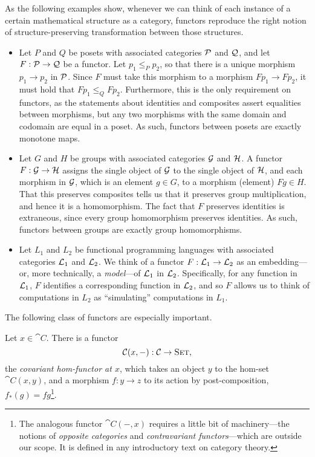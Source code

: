 \begin{ex}\label{ex:abstract-functors}
  As the following examples show, whenever we can think of each instance of a
  certain mathematical structure as a category, functors reproduce the right
  notion of structure-preserving transformation between those structures.
  \begin{itemize}
    \item Let $P$ and $Q$ be posets with associated categories $\mathcal{P}$ and $\mathcal{Q}$,
      and let $F: \mathcal{P}\to\mathcal{Q}$ be a functor. Let $p_1\leq_P p_2$, so that there is
      a unique morphism $p_1\to p_2$ in $\mathcal{P}$. Since $F$ must take this morphism
      to a morphism $Fp_1\to Fp_2$, it must hold that $Fp_1\leq_Q Fp_2$.
      Furthermore, this is the only requirement on functors, as the statements
      about identities and composites assert equalities between morphisms, but
      any two morphisms with the same domain and codomain are equal in a poset.
      As such, functors between posets are exactly monotone maps.
    \item Let $G$ and $H$ be groups with associated categories $\mathcal{G}$ and
      $\mathcal{H}$. A functor $F: \mathcal{G}\to\mathcal{H}$ assigns the single object of $\mathcal{G}$ to the
      single object of $\mathcal{H}$, and each morphism in $\mathcal{G}$, which is an element $g\in
      G$, to a morphism (element) $Fg\in H$. That this preserves composites tells us
      that it preserves group multiplication, and hence it is a homomorphism. The
      fact that $F$ preserves identities is extraneous, since every group
      homomorphism preserves identities. As such, functors between groups are exactly
      group homomorphisms.
    \item Let $L_1$ and $L_2$ be functional programming languages with associated
      categories $\mathcal{L}_1$ and $\mathcal{L}_2$. We think of a functor $F: \mathcal{L}_1\to\mathcal{L}_2$ as an
      embedding---or, more technically, a \emph{model}---of $\mathcal{L}_1$ in $\mathcal{L}_2$.
      Specifically, for any function in $\mathcal{L}_1$, $F$ identifies a corresponding
      function in $\mathcal{L}_2$, and so $F$ allows us to think of computations in $L_2$ as
      ``simulating'' computations in $L_1$.
  \end{itemize}
\end{ex}

The following class of functors are especially important.

\begin{dfn}\label{def:hom-functors}
  Let $x\in\cat{C}$. There is a functor \[
    {\mathcal{C}}(x, -):{\mathcal{C}}\to{\textsc{\text{Set}}},
  \] the \emph{covariant hom-functor at $x$}, which takes an object $y$ to the
  hom-set $\cat{C}(x, y)$, and a morphism $f: y\to z$ to its action by
  post-composition, $f_*(g) = fg$\footnote{The analogous functor $\cat{C}(-, x)$
    requires a little bit of machinery---the notions of \emph{opposite
  categories} and \emph{contravariant functors}---which are outside our scope.
  It is defined in any introductory text on category theory.}.
\end{dfn}

